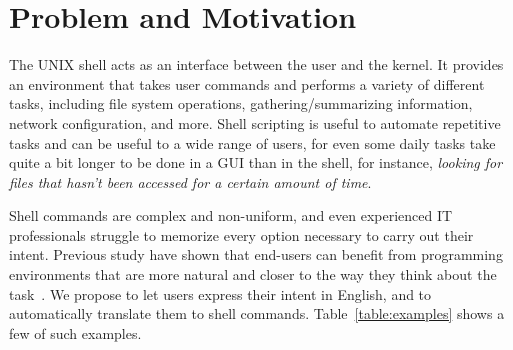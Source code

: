 \section{Problem and Motivation}

The UNIX shell acts as an interface between the user and the kernel. It provides an environment that takes user commands and performs a variety of different tasks, including file system operations, gathering/summarizing information, network configuration, and more. Shell scripting is useful to automate repetitive tasks and can be useful to a wide range of users, for even some daily tasks take quite a bit longer to be done in a GUI than in the shell, for instance, {\it looking for files that hasn't been accessed for a certain amount of time}.

Shell commands are complex and non-uniform, 
and even experienced IT professionals struggle to memorize every option necessary to carry out their intent. Previous study have shown that end-users can benefit from programming environments that are more natural and closer to the way they think about the task~\cite{Myers:2004:NPL:1015864.1015888}. We propose to let users express their intent in English, and to automatically translate them to shell commands.
Table~\ref{table:examples} shows a few of such examples.
 
